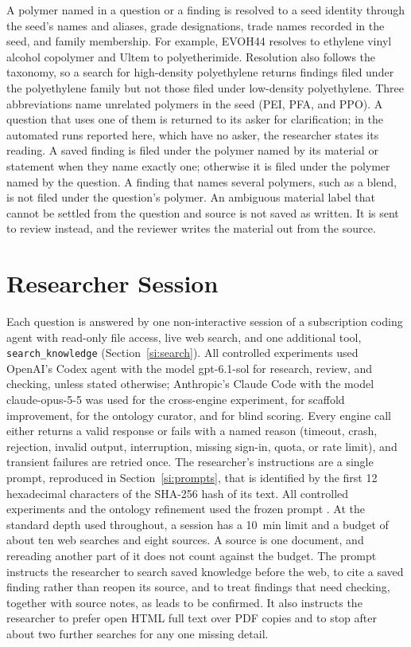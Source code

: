 \documentclass[journal=mamobx,manuscript=suppinfo]{achemso}
\newcommand{\code}[1]{\texttt{#1}}
\newcommand{\ident}[1]{\path{#1}}
\begin{document}
A polymer named in a question or a finding is resolved to a seed identity through the seed's names and aliases, grade designations, trade names recorded in the seed, and family membership.
For example, EVOH44 resolves to ethylene vinyl alcohol copolymer and Ultem to polyetherimide.
Resolution also follows the taxonomy, so a search for high-density polyethylene returns findings filed under the polyethylene family but not those filed under low-density polyethylene.
Three abbreviations name unrelated polymers in the seed (PEI, PFA, and PPO).
A question that uses one of them is returned to its asker for clarification; in the automated runs reported here, which have no asker, the researcher states its reading.
A saved finding is filed under the polymer named by its material or statement when they name exactly one; otherwise it is filed under the polymer named by the question.
A finding that names several polymers, such as a blend, is not filed under the question's polymer.
An ambiguous material label that cannot be settled from the question and source is not saved as written.
It is sent to review instead, and the reviewer writes the material out from the source.

\section{Researcher Session}
\label{si:researcher}

Each question is answered by one non-interactive session of a subscription coding agent with read-only file access, live web search, and one additional tool, \code{search\_knowledge} (Section~\ref{si:search}).
All controlled experiments used OpenAI's Codex agent with the model gpt-6.1-sol for research, review, and checking, unless stated otherwise; Anthropic's Claude Code with the model claude-opus-5-5 was used for the cross-engine experiment, for scaffold improvement, for the ontology curator, and for blind scoring.
Every engine call either returns a valid response or fails with a named reason (timeout, crash, rejection, invalid output, interruption, missing sign-in, quota, or rate limit), and transient failures are retried once.
The researcher's instructions are a single prompt, reproduced in Section~\ref{si:prompts}, that is identified by the first 12 hexadecimal characters of the SHA-256 hash of its text.
All controlled experiments and the ontology refinement used the frozen prompt \ident{0b7bb1483235}.
At the standard depth used throughout, a session has a 10~min limit and a budget of about ten web searches and eight sources.
A source is one document, and rereading another part of it does not count against the budget.
The prompt instructs the researcher to search saved knowledge before the web, to cite a saved finding rather than reopen its source, and to treat findings that need checking, together with source notes, as leads to be confirmed.
It also instructs the researcher to prefer open HTML full text over PDF copies and to stop after about two further searches for any one missing detail.
\end{document}
